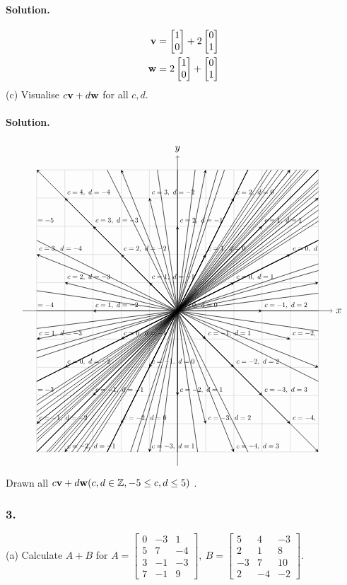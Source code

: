 \paragraph{Solution.}
\begin{align*}
    \vb{v} = \begin{bmatrix}
        1\\0
    \end{bmatrix} + 2\begin{bmatrix}
        0\\1
    \end{bmatrix}\\
    \vb{w} = 2\begin{bmatrix}
        1\\0
    \end{bmatrix} + \begin{bmatrix}
        0\\1
    \end{bmatrix}
\end{align*}
\newpage
(c) Visualise $c\vb{v}+d\vb{w}$ for all $c, d$.
\paragraph{Solution.}
\begin{align*}
    \begin{tikzpicture}
        \draw[thin,gray!40] (-5,-5) grid (5,5);
        \draw[->] (-5.5,0)--(5.5,0) node[right]{$x$};
        \draw[->] (0,-5.5)--(0,5.5) node[above]{$y$};
        \begin{scope}
            \clip (-5,-5) rectangle (5,5);
            \foreach \c/\sc in {-5, ..., 5} {
                \foreach \d/\sd in {-5, ..., 5} {
                    \pgfmathsetmacro\x{\c + \d * 2}
                    \pgfmathsetmacro\y{\c * 2 + \d}
                    \draw[line width=0.5pt,black,-stealth](0,0)--(\x, \y) node[anchor=south west, scale=0.7]{$c=\c,\ d=\d$};
                }
            }
        \end{scope}
    \end{tikzpicture}
\end{align*}
Drawn all $c\vb{v}+d\vb{w} (c, d \in \mathbb{Z}, -5 \leq c, d\leq 5)$ .
\subsubsection{3.}
(a) Calculate $A + B$ for $A = \begin{bmatrix}
    0 & -3 & 1 \\
    5 & 7 & -4 \\
    3 & -1 & -3 \\
    7 & -1 & 9
\end{bmatrix},\ B = \begin{bmatrix}
    5 & 4 & -3 \\
    2 & 1 & 8 \\
    -3 & 7 & 10 \\
    2 & -4 & -2
\end{bmatrix}$.
